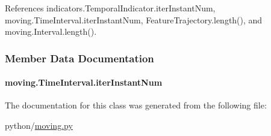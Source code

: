 References indicators.\-Temporal\-Indicator.\-iter\-Instant\-Num, moving.\-Time\-Interval.\-iter\-Instant\-Num, Feature\-Trajectory.\-length(), and moving.\-Interval.\-length().



\subsubsection{Member Data Documentation}
\hypertarget{classmoving_1_1TimeInterval_a0b89a5bb9aa3921e0773f91725a444af}{
\paragraph[{iter\-Instant\-Num}]{\setlength{\rightskip}{0pt plus 5cm}moving.\-Time\-Interval.\-iter\-Instant\-Num}}\label{classmoving_1_1TimeInterval_a0b89a5bb9aa3921e0773f91725a444af}


The documentation for this class was generated from the following file\-:\begin{DoxyCompactItemize}
\item 
python/\hyperlink{moving_8py}{moving.\-py}\end{DoxyCompactItemize}
